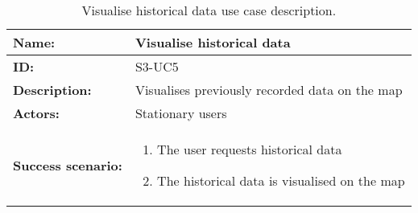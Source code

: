 \begin{table}[htbp]
    \centering
    \begin{tabularx}{\textwidth}{lX}
        \toprule
        \textbf{Name:}  & Visualise historical data \\ \midrule
        \textbf{ID:}    & S3-UC5 \\ \midrule
        \textbf{Description:} & Visualises previously recorded data on the map \\ \midrule
        \textbf{Actors:} & Stationary users \\ \midrule
        \textbf{Success scenario:} & 
        \begin{enumerate}
            \item The user requests historical data
            \item The historical data is visualised on the map
        \end{enumerate} \\ \bottomrule
    \end{tabularx}
    \caption{Visualise historical data use case description.}
    \label{tab:s3-uc5}
\end{table}